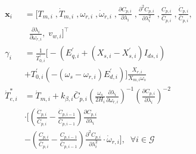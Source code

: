 \documentclass[letterpaper, 10 pt, conference]{ieeeconf}
\newcommand{\matr}[1]{\mathbf{#1}}
\begin{document}
\begin{align}
\matr{x}_i&=[T_{m,i}\;,\dot{T}_{m,i}\;,\omega_{r,i}\;,\dot{\omega}_{r,i}\;,\frac{\partial C_{p,i}}{\partial\lambda_i}\; , \frac{\partial^2C_{p,i}}{\partial\lambda_i^2}\;,\frac{C_{p,i}}{\bar{C}_{p,i}}\;, \frac{\dot{C}_{p,i}}{\bar{C}_{p,i}},\nonumber\\
&\;\;\frac{\partial \lambda_i}{\partial \omega_{r,i}},\;v_{w,i}]^\top\\
\gamma_i&=\frac{1}{T_{0,i}^'}\Big[-(E_{q,i}^'+(X_{s,i}-X_{s,i}^')I_{ds,i})\nonumber\\&+T_{0,i}^'(-(\omega_s-\omega_{r,i})E_{d,i}^')\Big]\frac{X_{r,i}}{X_{m,i}\omega_s}\\
\dot{T}_{e,i}^{*}&=\dot{T}_{m,i}+k_{\beta,i}\bar{C}_{p,i}(\frac{\omega_s}{2H_i}\frac{\partial \lambda_i}{\partial \omega_{r,i}})^{-1}(\frac{\partial C_{p,i}}{\partial \lambda_i})^{-2}\nonumber\\
&\cdot\Big[(\frac{\dot{C}_{p,i}}{\bar{C}_{p,i}}-\frac{\dot{C}_{p,i-1}}{\bar{C}_{p,i-1}})\frac{\partial C_{p,i}}{\partial \lambda_i}
\nonumber\\
&-(\frac{C_{p,i}}{\bar{C}_{p,i}}-\frac{C_{p,i-1}}{\bar{C}_{p,i-1}})\frac{\partial^2 C_{p,i}}{\partial \lambda_i^2}\cdot\dot{\omega}_{r,i}\Big],\;\;\forall i\in\mathcal{G}
\end{align}


\nocite{*}
\IEEEpeerreviewmaketitle

{}
\end{document}
